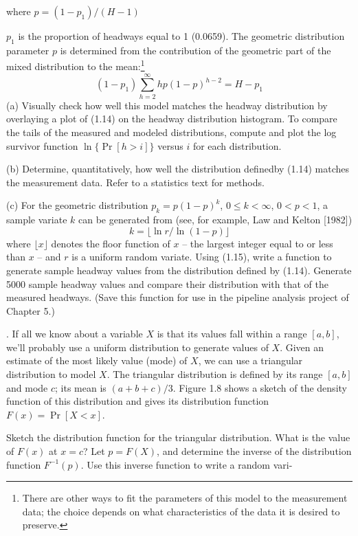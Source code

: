 \noindent where $p=(1-p_1)/(H-1)$

$p_1$ is the proportion of headways equal to 1 (0.0659). The geometric
distribution parameter $p$ is determined from the contribution of the geometric
part of the mixed distribution to the mean:\footnote{There are other ways to fit
the parameters of this model to the measurement data; the choice depends on
what characteristics of the data it is desired to preserve.}
\[
(1-p_1)\sum_{h=2}^{\infty} hp(1-p)^{h-2}=H-p_1
\]
\noindent (a) Visually check how well this model matches the headway distribution
by overlaying a plot of (1.14) on the headway distribution histogram. To compare
the tails of the measured and modeled distributions, compute and plot the log
survivor function $\ln\{\Pr[h>i]\}$ versus $i$ for each distribution.

\noindent (b) Determine, quantitatively, how well the distribution defined\newline by
(1.14) matches the measurement data. Refer to a statistics text for methods.

\noindent (c) For the geometric distribution $p_k=p(1-p)^k$, $0\leq k<\infty$,
$0<p<1$, a sample variate $k$ can be generated from (see, for example, Law and
Kelton [1982])
\begin{equation}
k=\lfloor\ln r/\ln(1-p)\rfloor
\end{equation}
where $\lfloor x\rfloor$ denotes the floor function of $x$ -- the largest integer
equal to or less than $x$ -- and $r$ is a uniform random variate. Using (1.15),
write a function to generate sample headway values from the distribution defined
by (1.14). Generate 5000 sample headway values and compare their distribution with
that of the measured headways. (Save this function for use in the pipeline
analysis project of Chapter 5.)

. If all we know about a variable $X$ is that its values fall within a
range $[a,b]$, we'll probably use a uniform distribution to generate values of
$X$. Given an estimate of the most likely value (mode) of $X$, we can use a
triangular distribution to model $X$. The triangular distribution is defined by
its range $[a,b]$ and mode $c$; its mean is $(a+b+c)/3$. Figure 1.8 shows a
sketch of the density function of this distribution and gives its distribution
function $F(x)=\Pr[X<x]$.

Sketch the distribution function for the triangular distribution. What is the
value of $F(x)$ at $x=c$? Let $p=F(X)$, and determine the inverse of the
distribution function $F^{-1}(p)$. Use this inverse function to write a random vari-

